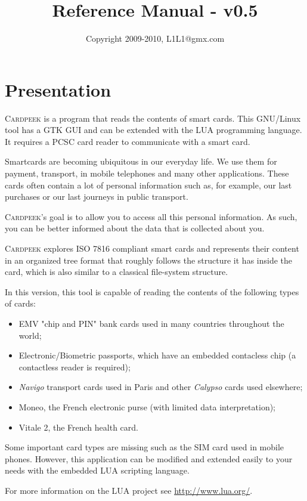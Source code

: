 \documentclass[11pt]{report}
\title{\huge{\Cardpeek{} Reference Manual - v0.5}}
\author{Copyright 2009-2010, L1L1@gmx.com}
\newcommand{\Cardpeek}{\textsc{Cardpeek}}
\begin{document}
\maketitle

\chapter*{Presentation}

\Cardpeek{} is a program that reads the contents of smart cards. 
This GNU/Linux tool has a GTK GUI and can be extended with the LUA programming language. 
It requires a PCSC card reader to communicate with a smart card.

Smartcards are becoming ubiquitous in our everyday life. 
We use them for payment, transport, in mobile telephones and many other applications.
These cards often contain a lot of personal information such as, for example, our last purchases or 
our last journeys in public transport.

\Cardpeek's goal is to allow you to access all this personal information. As such, you 
can be better informed about the data that is collected about you.

\Cardpeek{} explores ISO 7816 compliant smart cards and represents their content in an organized 
tree format that roughly follows the structure it has inside the card, which is also similar to a 
classical file-system structure.

In this version, this tool is capable of reading the contents of the following types of cards:
\begin{itemize}
\item{EMV "chip and PIN" bank cards used in many countries throughout the world;}
\item{Electronic/Biometric passports, which have an embedded contacless chip (a contactless reader is required);}
\item{\textit{Navigo} transport cards used in Paris and other \textit{Calypso} cards used elsewhere;}
\item{Moneo, the French electronic purse (with limited data interpretation);}
\item{Vitale 2, the French health card.}
\end{itemize}

Some important card types are missing such as the SIM card used in mobile phones.
However, this application can be modified and extended easily to your needs with the embedded LUA scripting language.

For more information on the LUA project see \url{http://www.lua.org/}.
\end{document}

